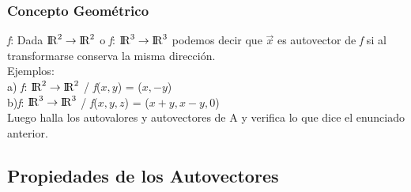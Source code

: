 \documentclass{article}
\begin{document}
\subsubsection{Concepto Geométrico}
\textit{f}: Dada ${\rm I\!R}^{2}\rightarrow {\rm I\!R}^{2}$ o \textit{f}: ${\rm I\!R}^{3}\rightarrow {\rm I\!R}^{3}$ podemos decir que $\vec{x}$ es autovector de \textit{f} si al transformarse conserva la misma dirección.\\
Ejemplos:\\
a) \textit{f}: ${\rm I\!R}^{2}\rightarrow {\rm I\!R}^{2}$ / \textit{f}($x,y$) = ($x, -y$)\\
b)\textit{f}: ${\rm I\!R}^{3}\rightarrow {\rm I\!R}^{3}$ / \textit{f}($x,y,z$) = ($x+y, x-y, 0$)\\
Luego halla los autovalores y autovectores de A y verifica lo que dice el enunciado anterior.\\
\newpage
\subsection{Propiedades de los Autovectores}
\end{document}
